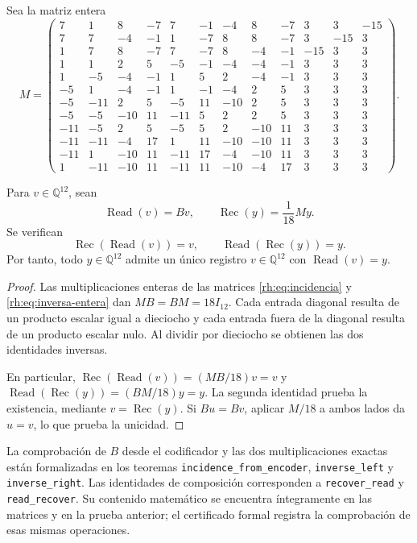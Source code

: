 Sea la matriz entera
\begingroup\small\setlength{\arraycolsep}{3pt}
\setcounter{MaxMatrixCols}{12}
\begin{equation}
M=\begin{pmatrix}
7&1&8&-7&7&-1&-4&8&-7&3&3&-15\\
7&7&-4&-1&1&-7&8&8&-7&3&-15&3\\
1&7&8&-7&7&-7&8&-4&-1&-15&3&3\\
1&1&2&5&-5&-1&-4&-4&-1&3&3&3\\
1&-5&-4&-1&1&5&2&-4&-1&3&3&3\\
-5&1&-4&-1&1&-1&-4&2&5&3&3&3\\
-5&-11&2&5&-5&11&-10&2&5&3&3&3\\
-5&-5&-10&11&-11&5&2&2&5&3&3&3\\
-11&-5&2&5&-5&5&2&-10&11&3&3&3\\
-11&-11&-4&17&1&11&-10&-10&11&3&3&3\\
-11&1&-10&11&-11&17&-4&-10&11&3&3&3\\
1&-11&-10&11&-11&11&-10&-4&17&3&3&3
\end{pmatrix}.
\label{rh:eq:inversa-entera}
\end{equation}
\endgroup

\begin{theorem}
\label{rh:thm:doce}
Para $v\in\mathbb Q^{12}$, sean
\[
\operatorname{Read}(v)=Bv,
\qquad
\operatorname{Rec}(y)=\frac1{18}My.
\]
Se verifican
\[
\operatorname{Rec}(\operatorname{Read}(v))=v,
\qquad
\operatorname{Read}(\operatorname{Rec}(y))=y.
\]
Por tanto, todo $y\in\mathbb Q^{12}$ admite un único registro
$v\in\mathbb Q^{12}$ con $\operatorname{Read}(v)=y$.
\end{theorem}
\begin{proof}
Las multiplicaciones enteras de las matrices
\eqref{rh:eq:incidencia} y \eqref{rh:eq:inversa-entera} dan
$MB=BM=18I_{12}$. Cada entrada diagonal resulta de un producto
escalar igual a dieciocho y cada entrada fuera de la diagonal resulta
de un producto escalar nulo. Al dividir por dieciocho se obtienen
las dos identidades inversas.

En particular,
$\operatorname{Rec}(\operatorname{Read}(v))=(MB/18)v=v$ y
$\operatorname{Read}(\operatorname{Rec}(y))=(BM/18)y=y$.
La segunda identidad prueba la existencia, mediante
$v=\operatorname{Rec}(y)$. Si $Bu=Bv$, aplicar $M/18$ a ambos
lados da $u=v$, lo que prueba la unicidad.
\end{proof}

La comprobación de $B$ desde el codificador y las dos multiplicaciones
exactas están formalizadas en los teoremas
\texttt{incidence\_from\_encoder}, \texttt{inverse\_left} y
\texttt{inverse\_right}. Las identidades de composición corresponden
a \texttt{recover\_read} y \texttt{read\_recover}.
Su contenido matemático se encuentra íntegramente en las matrices y
en la prueba anterior; el certificado formal registra la comprobación
de esas mismas operaciones.

